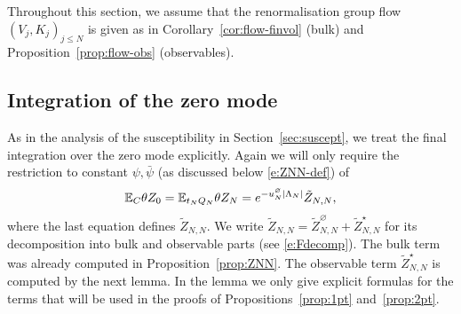 \documentclass[11pt]{amsart}
\numberwithin{equation}{section}
\numberwithin{theorem}{section}
\newcommand{\1}{{\bf 1}}
\newcommand{\obs}{\star}
\begin{document}
Throughout this section, we assume that the renormalisation group flow
$(V_j,K_j)_{j \leq N}$ is given as in Corollary~\ref{cor:flow-finvol} (bulk)
and Proposition~\ref{prop:flow-obs} (observables).


\subsection{Integration of the zero mode}

As in the analysis of the susceptibility in Section~\ref{sec:suscept},
we treat the final integration over the zero mode explicitly.
Again we will only require the restriction to constant $\psi,\bar\psi$
(as discussed below \eqref{e:ZNN-def}) of
\begin{equation}
  \mathbb{E}_{C} \theta Z_0
  = \mathbb{E}_{t_N Q_N} \theta Z_N = e^{-u^\varnothing_N|\Lambda_N|} \tilde Z_{N,N},
\end{equation}
where the last equation defines $\tilde Z_{N,N}$. We write
$\tilde Z_{N,N}=\tilde Z_{N,N}^{\varnothing}+\tilde Z_{N,N}^{\obs}$
for its decomposition into bulk and observable parts (see \eqref{e:Fdecomp}).
The bulk term was already computed in Proposition~\ref{prop:ZNN}.  The observable
term $\tilde Z_{N,N}^\obs$ is computed by the next lemma.
In the lemma we only give explicit formulas for the terms that will be used in the proofs of
Propositions~\ref{prop:1pt} and~\ref{prop:2pt}.
\end{document}
